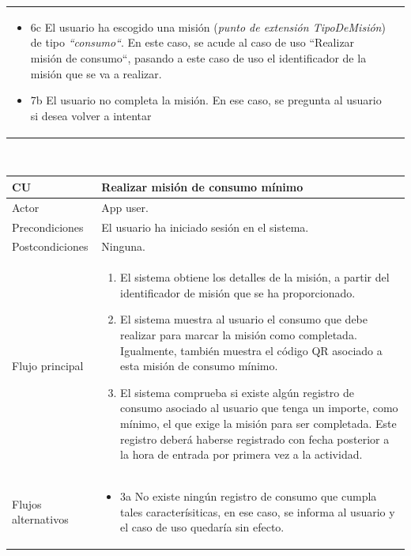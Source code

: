 \documentclass[twoside]{report}
\newcommand\addrow[2]{#1 &#2\\ }
\newcommand\addheading[2]{#1 &#2\\ \hline}
\newcommand\tabularhead{\begin{tabular}{lp{0.7\textwidth}}
\hline
}
\newenvironment{usecase}{\tabularhead}
{\hline\end{tabular}}
\begin{document}
\begin{usecase}
{\begin{itemize}
        \item 6c El usuario ha escogido una misión (\textit{punto de extensión TipoDeMisión}) de tipo \textit{“consumo“}. En este caso, se acude al caso de uso “Realizar misión de consumo“, pasando a este caso de uso el identificador de la misión que se va a realizar.
        
        \item 7b El usuario no completa la misión. En ese caso, se pregunta al usuario si desea volver a intentar
  		\end{itemize}
  }
\end{usecase}\\

\vspace{0.5cm}

\begin{usecase}
  \addheading{\textbf{CU\arabic{usecase}}}{Realizar misión de consumo mínimo} 
  \addrow{Actor}{App user.}
  \addrow{Precondiciones}{El usuario ha iniciado sesión en el sistema.}
  \addrow{Postcondiciones}{Ninguna.}
  \addrow{Flujo principal}{
  		\begin{enumerate}
  		\item El sistema obtiene los detalles de la misión, a partir del identificador de misión que se ha proporcionado.
  		\item El sistema muestra al usuario el consumo que debe realizar para marcar la misión como completada. Igualmente, también muestra el código QR asociado a esta misión de consumo mínimo.
  		\item El sistema comprueba si existe algún registro de consumo asociado al usuario que tenga un importe, como mínimo, el que exige la misión para ser completada. Este registro deberá haberse registrado con fecha posterior a la hora de entrada por primera vez a la actividad.
  		\end{enumerate}
  }
  \addrow{Flujos alternativos}{
  		\begin{itemize}
  		\item 3a No existe ningún registro de consumo que cumpla tales caracterísiticas, en ese caso, se informa al usuario y el caso de uso quedaría sin efecto.
  		\end{itemize}
  }
\end{usecase}\\

\vspace{0.5cm}
\end{document}
